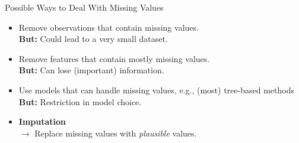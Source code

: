 \documentclass[11pt,compress,t,notes=noshow, xcolor=table]{beamer}
\begin{document}
\begin{frame}{Possible Ways to Deal With Missing Values}

    \begin{itemize}
        \item Remove observations that contain missing values. \\
              \textbf{But:} Could lead to a very small dataset.
        
        \item Remove features that contain mostly missing values. \\
              \textbf{But:} Can lose (important) information.
        
        \item Use models that can handle missing values, e.g., (most) tree-based methods \\
              \textbf{But:} Restriction in model choice.
        
        \item \textbf{Imputation} \\
              $\rightarrow$ Replace missing values with \textit{plausible} values.
    \end{itemize}

\end{frame}

\endlecture
\end{document}
